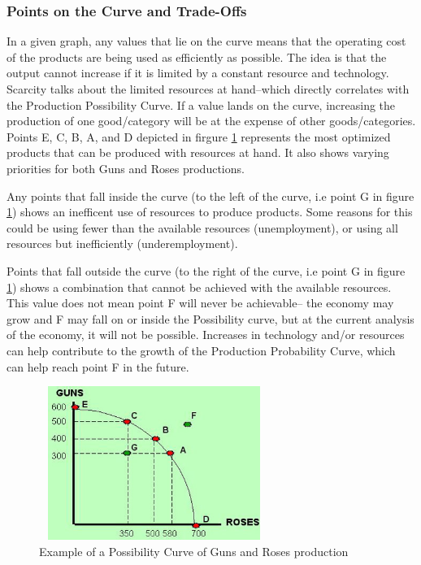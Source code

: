 \documentclass[a4paper, 12pt] {article}
\begin{document}
\subsubsection{Points on the Curve and Trade-Offs}
In a given graph, any values that lie on the curve means that the operating cost
of the products are being used as efficiently as possible. The idea is that the
output cannot increase if it is limited by a constant resource and technology.
Scarcity talks about the limited resources at hand--which directly correlates
with the Production Possibility Curve. If a value lands on the curve, increasing
the production of one good/category will be at the expense of other goods/categories.
Points E, C, B, A, and D depicted in firgure \ref{fig:GnR1} represents the most
optimized products that can be produced with resources at hand. It also shows
varying priorities for both Guns and Roses productions.

Any points that fall inside the curve (to the left of the curve, i.e point G in
figure \ref{fig:GnR1}) shows an inefficent use of resources to produce products.
Some reasons for this could be using fewer than the available resources
(unemployment), or using all resources but inefficiently (underemployment).

Points that fall outside the curve (to the right of the curve, i.e point G in
figure \ref{fig:GnR1}) shows a combination that cannot be achieved with the
available resources. This value does not mean point F will never be achievable--
the economy may grow and F may fall on or inside the Possibility curve, but at
the current analysis of the economy, it will not be possible.
Increases in technology and/or resources can help contribute to the growth of
the Production Probability Curve, which can help reach point F in the future.

\begin{figure}[h]
    \centering
    \includegraphics[width=7.5cm, height=5cm]{Production_Possibility_Curve.jpg}
    \caption{Example of a Possibility Curve of Guns and Roses production}
    \label{fig:GnR1}
\end{figure}
\end{document}
